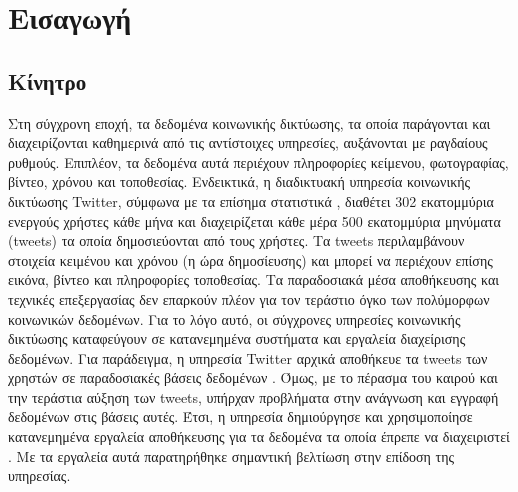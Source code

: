 \chapter{Εισαγωγή}

\section{Κίνητρο}

Στη σύγχρονη εποχή, τα δεδομένα κοινωνικής δικτύωσης, τα οποία παράγονται και  
διαχειρίζονται καθημερινά από τις αντίστοιχες υπηρεσίες, αυξάνονται με ραγδαίους ρυθμούς. 
Επιπλέον, τα δεδομένα αυτά περιέχουν πληροφορίες κείμενου, φωτογραφίας, βίντεο, χρόνου και τοποθεσίας. Ενδεικτικά, η διαδικτυακή υπηρεσία κοινωνικής δικτύωσης Twitter, 
σύμφωνα με τα επίσημα στατιστικά \cite{1}, διαθέτει 302 εκατομμύρια ενεργούς χρήστες κάθε μήνα και διαχειρίζεται κάθε μέρα 500 εκατομμύρια μηνύματα (tweets) 
τα οποία δημοσιεύονται από τους χρήστες. Τα tweets περιλαμβάνουν στοιχεία κειμένου και χρόνου (η ώρα δημοσίευσης) και μπορεί να περιέχουν επίσης 
εικόνα, βίντεο και \linebreak πληροφορίες τοποθεσίας. Τα παραδοσιακά μέσα αποθήκευσης και τεχνικές επεξεργασίας δεν \linebreak επαρκούν πλέον για τον τεράστιο όγκο των πολύμορφων 
κοινωνικών δεδομένων. Για το λόγο αυτό, οι σύγχρονες υπηρεσίες κοινωνικής δικτύωσης 
καταφεύγουν σε κατανεμημένα συστήματα και εργαλεία διαχείρισης δεδομένων. Για παράδειγμα, η υπηρεσία Twitter αρχικά 
αποθήκευε τα tweets των \linebreak χρηστών σε παραδοσιακές βάσεις δεδομένων \cite{2}. Όμως, με το πέρασμα του καιρού και την τεράστια αύξηση των 
tweets, υπήρχαν προβλήματα στην ανάγνωση και εγγραφή δεδομένων στις βάσεις αυτές. Έτσι, η υπηρεσία δημιούργησε και χρησιμοποίησε κατανεμημένα εργαλεία αποθήκευσης 
για τα \linebreak δεδομένα τα οποία έπρεπε να διαχειριστεί \cite{4}. Με τα εργαλεία αυτά παρατηρήθηκε σημαντική \linebreak βελτίωση στην επίδοση της υπηρεσίας. 

